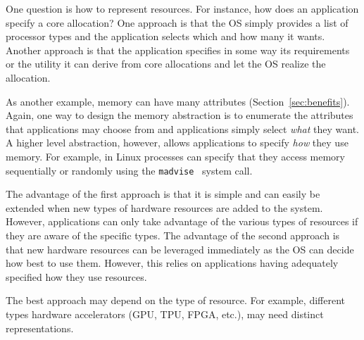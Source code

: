 One question is how to represent resources. For instance, how does
an application specify a core allocation?
One approach is that the OS simply provides a list of
processor types and the application selects which and how many it
wants.
Another approach is that the application specifies in some way
its requirements or the utility it can derive from core allocations
and let the OS realize the allocation.

As another example, memory can have many attributes
(Section~\ref{sec:benefits}).  Again, one way to design the memory
abstraction is to enumerate the attributes that applications may
choose from and applications simply select \emph{what} they want.  A higher
level abstraction, however, allows applications to specify \emph{how}
they use memory.  For example, in Linux processes can specify that
they access memory sequentially or randomly using the
\texttt{madvise}~\cite{madvise} system call.

The advantage of the first approach is that it is simple and can
easily be extended when new types of hardware resources are added 
to the system.  However, applications can only take advantage of
the various types of resources if they are aware of the specific
types.  The advantage of the second approach is that new hardware
resources can be leveraged immediately as the OS can decide how
best to use them.  However, this relies on applications having
adequately specified how they use resources.

The best approach may depend on the type of resource.
For example, different types hardware accelerators
(GPU, TPU, FPGA, etc.), may need distinct representations.
